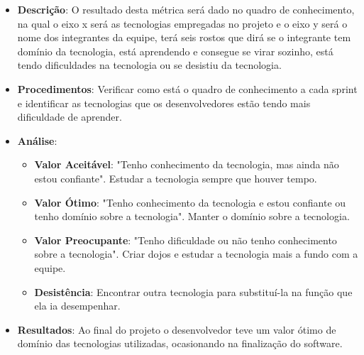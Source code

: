 \begin{itemize}
  \item \textbf{Descrição}: O resultado desta métrica será dado no quadro de conhecimento, na qual o eixo x será as tecnologias empregadas no projeto e o eixo y será o nome dos integrantes da equipe, terá seis rostos que dirá se o integrante tem domínio da tecnologia, está aprendendo e consegue se virar sozinho, está tendo dificuldades na tecnologia ou se desistiu da tecnologia.
  \item \textbf{Procedimentos}: Verificar como está o quadro de conhecimento a cada sprint e identificar as tecnologias
    que os desenvolvedores estão tendo mais dificuldade de aprender.
  \item \textbf{Análise}:
    \begin{itemize}
      \item \textbf{Valor Aceitável}: "Tenho conhecimento da tecnologia, mas ainda não estou confiante". Estudar a tecnologia sempre que houver tempo.
      \item \textbf{Valor Ótimo}: "Tenho conhecimento da tecnologia e estou confiante ou tenho domínio sobre a tecnologia". Manter o domínio sobre a tecnologia.
      \item \textbf{Valor Preocupante}: "Tenho dificuldade ou não tenho conhecimento sobre a tecnologia". Criar dojos e estudar a tecnologia mais a fundo com a equipe.
      \item \textbf{Desistência}: Encontrar outra tecnologia para substituí-la na função que ela ia desempenhar.
    \end{itemize}
  \item \textbf{Resultados}: Ao final do projeto o desenvolvedor teve um valor ótimo de domínio das tecnologias utilizadas, ocasionando na finalização do software.
\end{itemize}
